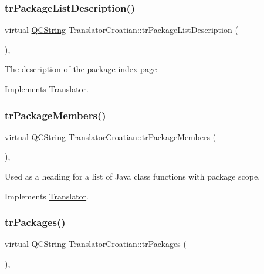 \subsubsection{\texorpdfstring{trPackageListDescription()}{trPackageListDescription()}}
{\footnotesize\ttfamily virtual \mbox{\hyperlink{class_q_c_string}{Q\+C\+String}} Translator\+Croatian\+::tr\+Package\+List\+Description (\begin{DoxyParamCaption}{ }\end{DoxyParamCaption})\hspace{0.3cm}{\ttfamily [inline]}, {\ttfamily [virtual]}}

The description of the package index page 

Implements \mbox{\hyperlink{class_translator}{Translator}}.

\mbox{\label{class_translator_croatian_ab2c5735f9ad7d480f81ca53583f8be4b}} 
\subsubsection{\texorpdfstring{trPackageMembers()}{trPackageMembers()}}
{\footnotesize\ttfamily virtual \mbox{\hyperlink{class_q_c_string}{Q\+C\+String}} Translator\+Croatian\+::tr\+Package\+Members (\begin{DoxyParamCaption}{ }\end{DoxyParamCaption})\hspace{0.3cm}{\ttfamily [inline]}, {\ttfamily [virtual]}}

Used as a heading for a list of Java class functions with package scope. 

Implements \mbox{\hyperlink{class_translator}{Translator}}.

\mbox{\label{class_translator_croatian_a30ab02a12a1ff7ec6f1b92b9e68ea3b2}} 
\subsubsection{\texorpdfstring{trPackages()}{trPackages()}}
{\footnotesize\ttfamily virtual \mbox{\hyperlink{class_q_c_string}{Q\+C\+String}} Translator\+Croatian\+::tr\+Packages (\begin{DoxyParamCaption}{ }\end{DoxyParamCaption})\hspace{0.3cm}{\ttfamily [inline]}, {\ttfamily [virtual]}}

